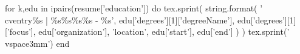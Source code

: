 

\begin{cventries}


  \begin{luacode}
    for k,edu in ipairs(resume['education']) do
      tex.sprint(
        string.format(
          '\\cventry{\%s | \%s}{\%s}{\%s}{\%s - \%s}{}',
          edu['degrees'][1]['degreeName'],
          edu['degrees'][1]['focus'],
          edu['organization'],
          'location',
          edu['start'],
          edu['end']
        )
      )
      tex.sprint('\\vspace{3mm}')
    end
  \end{luacode}


\end{cventries}
